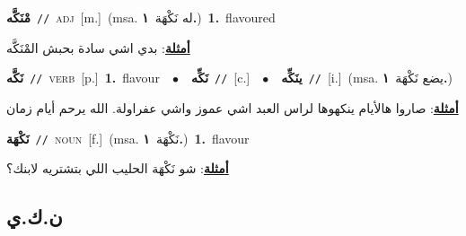 \documentclass[10pt,a4paper,twoside]{article} %
\begin{document}
\begin{multicols}{2}
{\setlength\topsep{0pt}\textbf{\foreignlanguage{arabic}{مْنَكَّه}}\ {\color{gray}\texttt{//}\color{black}}\ \textsc{adj}\ [m.]\ \color{gray}(msa. \foreignlanguage{arabic}{له نَكْهَة}~\foreignlanguage{arabic}{\textbf{١.}})\color{black}\ \textbf{1.}~flavoured\  \begin{flushright}\color{gray}\foreignlanguage{arabic}{\textbf{\underline{\foreignlanguage{arabic}{أمثلة}}}: بدي اشي سادة بحبش المْنَكَّه}\end{flushright}\color{black}} \vspace{2mm}

{\setlength\topsep{0pt}\textbf{\foreignlanguage{arabic}{نَكَّه}}\ {\color{gray}\texttt{//}\color{black}}\ \textsc{verb}\ [p.]\ \textbf{1.}~flavour\ \ $\bullet$\ \ \setlength\topsep{0pt}\textbf{\foreignlanguage{arabic}{نَكِّه}}\ {\color{gray}\texttt{//}\color{black}}\ [c.]\ \ $\bullet$\ \ \setlength\topsep{0pt}\textbf{\foreignlanguage{arabic}{ينَكِّه}}\ {\color{gray}\texttt{//}\color{black}}\ [i.]\ \color{gray}(msa. \foreignlanguage{arabic}{يضع نَكْهَة}~\foreignlanguage{arabic}{\textbf{١.}})\color{black}\  \begin{flushright}\color{gray}\foreignlanguage{arabic}{\textbf{\underline{\foreignlanguage{arabic}{أمثلة}}}: صاروا هالأيام ينكهوها لراس العبد اشي عموز واشي عفراولة. الله يرحم أيام زمان}\end{flushright}\color{black}} \vspace{2mm}

{\setlength\topsep{0pt}\textbf{\foreignlanguage{arabic}{نَكْهَة}}\ {\color{gray}\texttt{//}\color{black}}\ \textsc{noun}\ [f.]\ \color{gray}(msa. \foreignlanguage{arabic}{نَكْهَة}~\foreignlanguage{arabic}{\textbf{١.}})\color{black}\ \textbf{1.}~flavour\  \begin{flushright}\color{gray}\foreignlanguage{arabic}{\textbf{\underline{\foreignlanguage{arabic}{أمثلة}}}: شو نَكْهَة الحليب اللي بتشتريه لابنك؟}\end{flushright}\color{black}} \vspace{2mm}

\vspace{-3mm}
\subsection*{\color{blue}\foreignlanguage{arabic}{ن.ك.ي}\color{blue}{}} 


\end{multicols}
\end{document}
